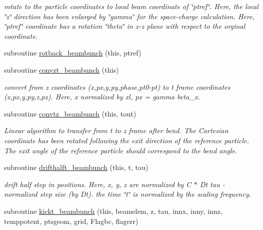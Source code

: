 \begin{DoxyCompactItemize}
\begin{DoxyCompactList}\small\item\em rotate to the particle coordinates to local beam coordinate of \char`\"{}ptref\char`\"{}. Here, the local \char`\"{}z\char`\"{} direction has been enlarged by \char`\"{}gamma\char`\"{} for the space-\/charge calculation. Here, \char`\"{}ptref\char`\"{} coordinate has a rotation \char`\"{}theta\char`\"{} in x-\/z plane with respect to the orginal coordinate. \end{DoxyCompactList}\item 
subroutine \mbox{\hyperlink{namespacebeambunchclass_a3b4334f47908375d6a6dc12f1509397c}{rotback\+\_\+beambunch}} (this, ptref)
\item 
subroutine \mbox{\hyperlink{namespacebeambunchclass_a82f485cba1b5e039b1a25b4b4bd9d81f}{convzt\+\_\+beambunch}} (this)
\begin{DoxyCompactList}\small\item\em convert from z coordinates (x,px,y,py,phase,pt0-\/pt) to t frame coordinates (x,px,y,py,z,pz). Here, x normalized by xl, px = gamma beta\+\_\+x. \end{DoxyCompactList}\item 
subroutine \mbox{\hyperlink{namespacebeambunchclass_a9d14e9a28575e2d4d173669b8e0356a7}{convtz\+\_\+beambunch}} (this, tout)
\begin{DoxyCompactList}\small\item\em Linear algorithm to transfer from t to z frame after bend. The Cartesian coordinate has been rotated following the exit direction of the reference particle. The exit angle of the reference particle should correspond to the bend angle. \end{DoxyCompactList}\item 
subroutine \mbox{\hyperlink{namespacebeambunchclass_a8970622c75fe29b57d31607d71692976}{drifthalft\+\_\+beambunch}} (this, t, tau)
\begin{DoxyCompactList}\small\item\em drift half step in positions. Here, x, y, z are normalized by C $\ast$ Dt tau -\/ normalized step size (by Dt). the time \char`\"{}t\char`\"{} is normalized by the scaling frequency. \end{DoxyCompactList}\item 
subroutine \mbox{\hyperlink{namespacebeambunchclass_a119b1d68c4a2a790014a9408c2db1575}{kickt\+\_\+beambunch}} (this, beamelem, z, tau, innx, inny, innz, temppotent, ptsgeom, grid, Flagbc, flagerr)
\item 

\end{DoxyCompactItemize}
